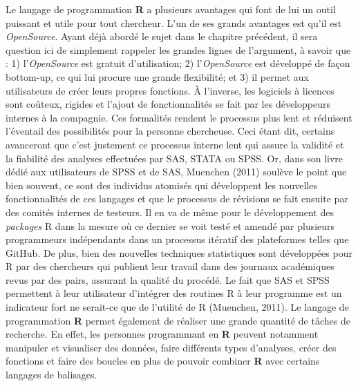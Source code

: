 \documentclass[
  letterpaper,
  DIV=11,
  numbers=noendperiod]{scrreprt}
\begin{document}
Le langage de programmation \textbf{R} a plusieurs avantages qui font de
lui un outil puissant et utile pour tout chercheur. L'un de ses grands
avantages est qu'il est \emph{OpenSource}. Ayant déjà abordé le sujet
dans le chapitre précédent, il sera question ici de simplement rappeler
les grandes lignes de l'argument, à savoir que : 1) l'\emph{OpenSource}
est gratuit d'utilisation; 2) l'\emph{OpenSource} est développé de façon
bottom-up, ce qui lui procure une grande flexibilité; et 3) il permet
aux utilisateurs de créer leurs propres fonctions. À l'inverse, les
logiciels à licences sont coûteux, rigides et l'ajout de fonctionnalités
se fait par les développeurs internes à la compagnie. Ces formalités
rendent le processus plus lent et réduisent l'éventail des possibilités
pour la personne chercheuse. Ceci étant dit, certains avanceront que
c'est justement ce processus interne lent qui assure la validité et la
fiabilité des analyses effectuées par SAS, STATA ou SPSS. Or, dans son
livre dédié aux utilisateurs de SPSS et de SAS, Muenchen (2011) soulève
le point que bien souvent, ce sont des individus atomisés qui
développent les nouvelles fonctionnalités de ces langages et que le
processus de révisions se fait ensuite par des comités internes de
testeurs. Il en va de même pour le développement des \emph{packages} R
dans la mesure où ce dernier se voit testé et amendé par plusieurs
programmeurs indépendants dans un processus itératif des plateformes
telles que GitHub. De plus, bien des nouvelles techniques statistiques
sont développées pour R par des chercheurs qui publient leur travail
dans des journaux académiques revus par des pairs, assurant la qualité
du procédé. Le fait que SAS et SPSS permettent à leur utilisateur
d'intégrer des routines R à leur programme est un indicateur fort ne
serait-ce que de l'utilité de R (Muenchen, 2011). Le langage de
programmation \textbf{R} permet également de réaliser une grande
quantité de tâches de recherche. En effet, les personnes programmant en
\textbf{R} peuvent notamment manipuler et visualiser des données, faire
différents types d'analyses, créer des fonctions et faire des boucles en
plus de pouvoir combiner \textbf{R} avec certains langages de balisages.
\end{document}
